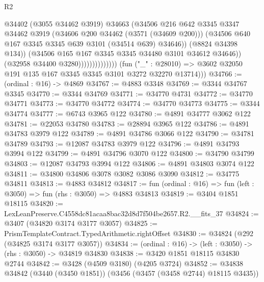 \begin{lexlean}{R2}
\begin{coremodule}
                                      @34402
                                      (@3055 @34462 @3919)
                                      @34663
                                      (@34506
                                        @216
                                        @642
                                        @3345
                                        @3347
                                        @34462
                                        @3919
                                        (@34606 @200 @34462 (@3571 (@34609 @200)))
                                        (@34506
                                          @640
                                          @167
                                          @3345
                                          @3345
                                          @639
                                          @3101
                                          (@34514 @639)
                                          @34646))
                                      (@8824 @34398 @134))
                                    (@34506 @165 @167 @3345 @3345 @34480 @3101 @34612 @34646))
                                  (@32958 @34400 @3280))))))))))))))
        (fun ("_" : @28010) => @3602 @32050 @191 @135 @167 @3345 @3345 @3101 @3272 @32270 @13714)))
@34766 := (ordinal : @16) -> @4869
@34767 := @4883 @3348
@34769 := @3344 @34767 @3345
@34770 := @3344 @34769
@34771 := @34770 @4731
@34772 := @34770 @34771
@34773 := @34770 @34772
@34774 := @34770 @34773
@34775 := @3344 @34774
@34777 := @6743 @3965 @122
@34780 := @4891 @34777 @3062 @122
@34781 := @22053 @34780
@34783 := @28894 @3965 @122
@34786 := @4891 @34783 @3979 @122
@34789 := @4891 @34786 @3066 @122
@34790 := @34781 @34789
@34793 := @12087 @34783 @3979 @122
@34796 := @4891 @34793 @3994 @122
@34799 := @4891 @34796 @3070 @122
@34800 := @34790 @34799
@34803 := @12087 @34793 @3994 @122
@34806 := @4891 @34803 @3074 @122
@34811 := @34800 @34806 @3078 @3082 @3086 @3090
@34812 := @34775 @34811
@34813 := @4883 @34812
@34817 := fun (ordinal : @16) => fun (left : @3050) => fun (rhs : @3050) => @4883 @34813
@34819 := @3404 @1851 @18115
@34820 := LexLeanPreserve.C4558dc81acaa8bac32d8d7f504be2657.R2.__fits_37
@34824 := @3407 (@34820 @3174 @3177 @3057)
@34825 := PrismTemplateContract.TypedArithmetic.rightOffset
@34830 := @34824 (@292 (@34825 @3174 @3177 @3057))
@34834 := (ordinal : @16) -> (left : @3050) -> (rhs : @3050) -> @34819 @34830
@34838 := @3420 @1851 @18115 @34830 @2744
@34842 := @3428 (@4509 @3180) (@4205 @3724)
@34852 := @34838 @34842 (@3440 (@3450 @1851)) (@3456 (@3457 (@3458 @2744) @18115 @3435))

\end{coremodule}
\end{lexlean}
